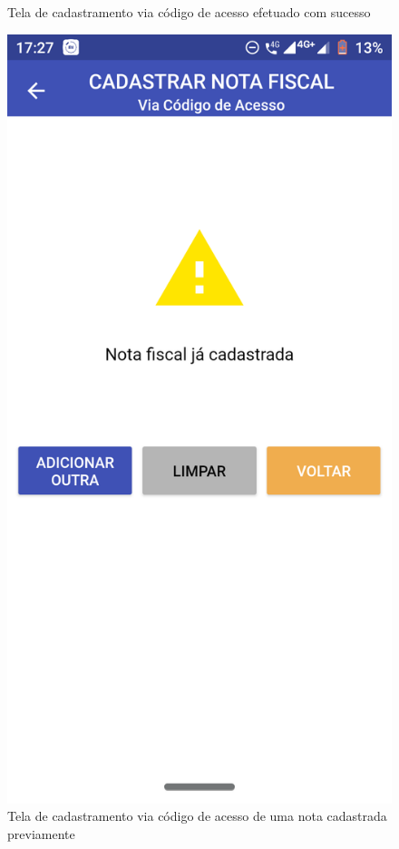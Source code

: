 \begin{figure}[h]
    \caption{Tela de cadastramento via código de acesso efetuado com sucesso}
    \label{appCodigoAcessoSucessoFig}
\end{figure}

\newpage
\begin{figure}[h]
    \centering
    \includegraphics[scale=0.15]{tcc/figures/app/app_codigo_acesso_ja_cadastrada.png}
    \caption{Tela de cadastramento via código de acesso de uma nota cadastrada previamente}
    \label{appCodigoAcessoJaCadastradaFig}
\end{figure}

